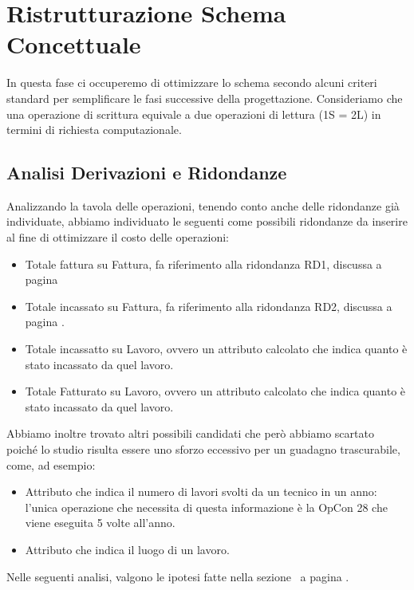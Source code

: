 \documentclass{elegantbook}
\begin{document}
	\section{Ristrutturazione Schema Concettuale}
        In questa fase ci occuperemo di ottimizzare lo schema secondo alcuni criteri standard per semplificare le fasi successive della progettazione.
        Consideriamo che una operazione di scrittura equivale a due operazioni di lettura (1S = 2L) in termini di richiesta computazionale.

	\subsection{Analisi Derivazioni e Ridondanze}
        Analizzando la tavola delle operazioni, tenendo conto anche delle ridondanze già individuate, abbiamo individuato le seguenti come possibili ridondanze da inserire
        al fine di ottimizzare il costo delle operazioni:

        \begin{itemize}
            \item Totale fattura su Fattura, fa riferimento alla ridondanza RD1, discussa a pagina \pageref{subsec:derivazioni}
            \item Totale incassato su Fattura, fa riferimento alla ridondanza RD2, discussa a pagina \pageref{subsec:derivazioni}.
            \item Totale incassatto su Lavoro, ovvero un attributo calcolato che indica quanto è stato incassato da quel lavoro.
            \item Totale Fatturato su Lavoro, ovvero un attributo calcolato che indica quanto è stato incassato da quel lavoro. 
        \end{itemize}
        Abbiamo inoltre trovato altri possibili candidati che però abbiamo scartato poiché lo studio risulta essere
        uno sforzo eccessivo per un guadagno trascurabile, come, ad esempio:
        \begin{itemize}
            \item Attributo che indica il numero di lavori svolti da un tecnico in un anno: l'unica operazione
                che necessita di questa informazione è la OpCon 28 che viene eseguita 5 volte all'anno.
            \item Attributo che indica il luogo di un lavoro.
        \end{itemize}
        Nelle seguenti analisi, valgono le ipotesi fatte nella sezione~ a pagina \pageref{sec:tavolaOperazioni}.
\end{document}
